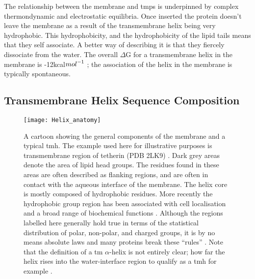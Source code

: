 

The relationship between the membrane and \gls{tmp}s is underpinned by complex thermondynamic and electrostatic equilibria. Once inserted the protein doesn't leave the membrane as a result of the transmembrane helix being very hydrophobic. This hydrophobicity, and the hydrophobicity of the lipid tails means that they self associate. A better way of describing it is that they fiercely dissociate from the water. The overall $\Delta$G for a transmembrane helix in the membrane is -12kcal${mol}^{\--1}$ \cite{Cymer2014}; the association of the helix in the membrane is typically spontaneous.

\subsection{Transmembrane Helix Sequence Composition}

\begin{figure}[!ht]
\centering
\texttt{[image: Helix\_anatomy]}
\caption{A cartoon showing the general components of the membrane and a typical \gls{tmh}. The example used here for illustrative purposes is transmembrane region of tetherin (PDB 2LK9) \cite{Skasko2012}. Dark grey areas denote the area of lipid head groups. The residues found in these areas are often described as flanking regions, and are often in contact with the aqueous interface of the membrane. The helix core is mostly composed of hydrophobic residues. More recently the hydrophobic group region has been associated with cell localisation and a broad range of biochemical functions \cite{Junne2010, Wong2012}. Although the regions labelled here generally hold true in terms of the statistical distribution of polar, non-polar, and charged groups, it is by no means absolute laws and many proteins break these ``rules'' \cite{Sharpe2010, Baeza-Delgado2013, Pogozheva2013}. Note that the definition of a \gls{tm} $\alpha$-helix is not entirely clear; how far the helix rises into the water-interface region to qualify as a \gls{tmh} for example \cite{VonHeijne2006}.}
\label{fig:helixcartoon1}
\end{figure}


